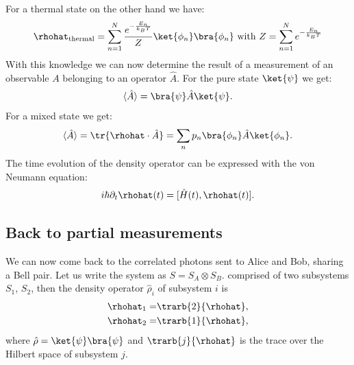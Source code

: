 For a thermal state on the other hand we have:
\begin{align}
	\rhohat_{\text{thermal}} = \sum_{n=1}^N \frac{e^{-\frac{E_n}{k_BT}}}{Z} \ket{\phi_n}\bra{\phi_n}\text{ with }Z = \sum_{n=1}^N e^{-\frac{E_n}{k_BT}}
\end{align}
With this knowledge we can now determine the result of a measurement of an observable $A$ belonging to an operator $\hat{A}$. For the pure state $\ket{\psi}$ we get:
%
\begin{align}
				\langle \hat{A}\rangle = \bra{\psi} \hat{A} \ket{\psi}.
\end{align}
For a mixed state we get:
\begin{align}
	\langle \hat{A}\rangle = \tr{\rhohat \cdot \hat{A}} = \sum_n {p_n} \bra{\phi_n} \hat{A} \ket{\phi_n}.
\end{align}
The time evolution of the density operator can be expressed with the von Neumann equation:
\begin{align}
	i\hbar \partial_{t}\rhohat(t) = [\hat{H}(t),\rhohat(t)].
\end{align}

\subsection{Back to partial measurements}

We can now come back to the correlated photons sent to Alice and Bob, sharing a Bell pair. Let us write the system as $S = S_A \otimes S_B$.  comprised of two subsystems $S_1$, $S_2$, then the density operator $\hat{\rho}_i$ of  subsystem $i$ is
					\begin{align}
						\rhohat_1=&\trarb{2}{\rhohat},\\
						\rhohat_2=&\trarb{1}{\rhohat},
					\end{align}
					where $\hat{\rho}=\ket{\psi}\bra{\psi}$ and $\trarb{j}{\rhohat}$ is the trace over the Hilbert space of subsystem $j$.
